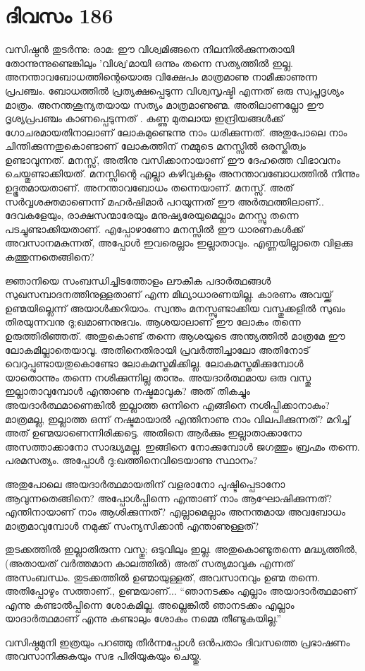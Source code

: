 \section{ദിവസം 186}


വസിഷ്ഠൻ തുടർന്നു: രാമ: ഈ വിശ്വമിങ്ങനെ നിലനില്‍ക്കുന്നതായി തോന്നുന്നുണ്ടെങ്കിലും 'വിശ്വ'മായി ഒന്നും തന്നെ സത്യത്തിൽ ഇല്ല. അനന്താവബോധത്തിന്റെയൊരു വിക്ഷേപം മാത്രമാണു നാമീക്കാണുന്ന പ്രപഞ്ചം. ബോധത്തിൽ പ്രത്യക്ഷപ്പെടുന്ന വിശ്വസൃഷ്ടി എന്നത് ഒരു സ്വപ്നദൃശ്യം മാത്രം. അനന്തശൂന്യതയായ സത്യം മാത്രമാണുണ്മ. അതിലാണല്ലോ ഈ ദൃശ്യപ്രപഞ്ചം കാണപ്പെടുന്നത് . കണ്ണു മുതലായ ഇന്ദ്രിയങ്ങൾക്ക് ഗോചരമായതിനാലാണ്‌ ലോകമുണ്ടെന്നു നാം ധരിക്കുന്നത്. അതുപോലെ നാം ചിന്തിക്കുന്നതുകൊണ്ടാണ്‌ ലോകത്തിന്‌ നമ്മുടെ മനസ്സിൽ ഒരസ്തിത്വം ഉണ്ടാവുന്നത്. മനസ്സ്, അതിനു വസിക്കാനായാണ്‌ ഈ ദേഹത്തെ വിഭാവനം ചെയ്തുണ്ടാക്കിയത്. മനസ്സിന്റെ എല്ലാ കഴിവുകളും അനന്താവബോധത്തിൽ നിന്നും ഉദ്ഭൂതമായതാണ്‌. അനന്താവബോധം തന്നെയാണ്‌. മനസ്സ്. അത് സർവ്വശക്തമാണെന്ന് മഹർഷിമാർ പറയുന്നത് ഈ അർത്ഥത്തിലാണ്‌.. ദേവകളേയും, രാക്ഷസന്മാരേയും മനുഷ്യരേയുമെല്ലാം മനസ്സു തന്നെ പടച്ചുണ്ടാക്കിയതാണ്‌. എപ്പോഴാണോ മനസ്സിൽ ഈ ധാരണകൾക്ക് അവസാനമകുന്നത്, അപ്പോൾ ഇവരെല്ലാം ഇല്ലാതാവും. എണ്ണയില്ലാതെ വിളക്കു കത്തുന്നതെങ്ങിനെ?

ജ്ഞാനിയെ സംബന്ധിച്ചിടത്തോളം ലൗകീക പദാർത്ഥങ്ങൾ സുഖസമ്പാദനത്തിനുള്ളതാണ് എന്ന മിഥ്യാധാരണയില്ല. കാരണം അവയ്ക്ക് ഉണ്മയില്ലെന്ന് അയാൾക്കറിയാം. സ്വന്തം മനസ്സുണ്ടാക്കിയ വസ്തുക്കളിൽ സുഖം തിരയുന്നവനു ദു;ഖമാണനുഭവം. ആശയാലാണ്‌ ഈ ലോകം തന്നെ ഉരുത്തിരിഞ്ഞത്. അതുകൊണ്ട് തന്നെ ആശയുടെ അന്ത്യത്തിൽ മാത്രമേ ഈ ലോകമില്ലാതെയാവൂ. അതിനെതിരായി പ്രവർത്തിച്ചാലോ അതിനോട് വെറുപ്പുണ്ടായതുകൊണ്ടോ ലോകമസ്തമിക്കില്ല. ലോകമസ്തമിക്കുമ്പോൾ യാതൊന്നും തന്നെ നശിക്കുന്നില്ല താനും. അയദാർത്ഥമായ ഒരു വസ്തു ഇല്ലാതാവുമ്പോൾ എന്താണു നഷ്ടമാവുക? അത് തികച്ചും അയദാർത്ഥമാണെങ്കിൽ ഇല്ലാത്ത ഒന്നിനെ എങ്ങിനെ നശിപ്പിക്കാനാകും? മാത്രമല്ല, ഇല്ലാത്ത ഒന്ന് നഷ്ടമായാൽ എന്തിനാണു നാം വിലപിക്കുന്നത്? മറിച്ച് അത് ഉണ്മയാണെന്നിരിക്കട്ടെ. അതിനെ ആർക്കും ഇല്ലാതാക്കാനോ അസത്താക്കാനോ സാദ്ധ്യമല്ല. ഇങ്ങിനെ നോക്കുമ്പോൾ ജഗത്തും ബ്രഹ്മം തന്നെ. പരമസത്യം. അപ്പോള്‍ ദു:ഖത്തിനെവിടെയാണു സ്ഥാനം?

അതുപോലെ അയദാർത്ഥമായതിന്‌ വളരാനോ പുഷ്ടിപ്പെടാനോ ആവുന്നതെങ്ങിനെ? അപ്പോൾപ്പിന്നെ എന്താണ്‌ നാം ആഘോഷിക്കുന്നത്? എന്തിനായാണ്‌ നാം ആശിക്കുന്നത്? എല്ലാമെല്ലാം അനന്തമായ അവബോധം മാത്രമാവുമ്പോൾ നമുക്ക് സംന്യസിക്കാൻ എന്താണുള്ളത്?

തുടക്കത്തിൽ ഇല്ലാതിരുന്ന വസ്തു; ഒടുവിലും ഇല്ല. അതുകൊണ്ടുതന്നെ മദ്ധ്യത്തിൽ, (അതായത് വർത്തമാന കാലത്തിൽ) അത് സത്യമാവുക എന്നത് അസംബന്ധം. തുടക്കത്തിൽ ഉണ്മായുള്ളത്, അവസാനവും ഉണ്മ തന്നെ. അതിപ്പോഴും സത്താണ്‌., ഉണ്മയാണ്‌...  “ഞാനടക്കം എല്ലാം അയാദാർത്ഥമാണ്‌ എന്നു കണ്ടാൽപ്പിന്നെ ശോകമില്ല. അല്ലെങ്കിൽ ഞാനടക്കം എല്ലാം യാദാർത്ഥമാണ്‌ എന്നു കണ്ടാലും ശോകം നമ്മെ തീണ്ടുകയില്ല.”

വസിഷ്ഠമുനി ഇത്രയും പറഞ്ഞു തീർന്നപ്പോൾ ഒൻപതാം ദിവസത്തെ പ്രഭാഷണം അവസാനിക്കുകയും സഭ പിരിയുകയും ചെയ്തു. 

